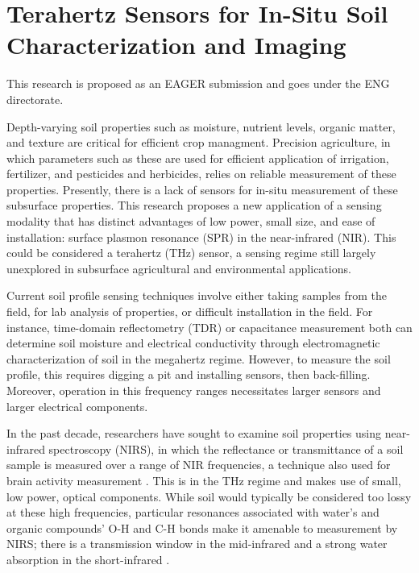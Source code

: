 \documentclass[11pt,letterpaper]{article}
\begin{document}
\section*{Terahertz Sensors for In-Situ Soil Characterization and Imaging}

This research is proposed as an EAGER submission and goes under the ENG directorate.


Depth-varying soil properties such as moisture, nutrient levels, organic matter, and texture are critical for efficient crop managment. Precision agriculture, in which parameters such as these are used for efficient application of irrigation, fertilizer, and pesticides and herbicides, relies on reliable measurement of these properties. Presently, there is a lack of sensors for in-situ measurement of these subsurface properties. This research proposes a new application of a sensing modality that has distinct advantages of low power, small size, and ease of installation: surface plasmon resonance (SPR) in the near-infrared (NIR). This could be considered a terahertz (THz) sensor, a sensing regime still largely unexplored in subsurface agricultural and environmental applications.

Current soil profile sensing techniques involve either taking samples from the field, for lab analysis of properties, or difficult installation in the field. For instance, time-domain reflectometry (TDR) \cite{topp1980electromagnetic} or capacitance measurement \cite{birchak1974high} both can determine soil moisture and electrical conductivity through electromagnetic characterization of soil in the megahertz regime. However, to measure the soil profile, this requires digging a pit and installing sensors, then back-filling. Moreover, operation in this frequency ranges necessitates larger sensors and larger electrical components.

In the past decade, researchers have sought to examine soil properties using near-infrared spectroscopy (NIRS), in which the reflectance or transmittance of a soil sample is measured over a range of NIR frequencies, a technique also used for brain activity measurement \cite{matsuyama2009design}. This is in the THz regime and makes use of small, low power, optical components. While soil would typically be considered too lossy at these high frequencies, particular resonances associated with water's and organic compounds' O-H and C-H bonds make it amenable to measurement by NIRS; there is a transmission window in the mid-infrared and a strong water absorption in the short-infrared \cite{lewis2017invited}. %
\end{document}
